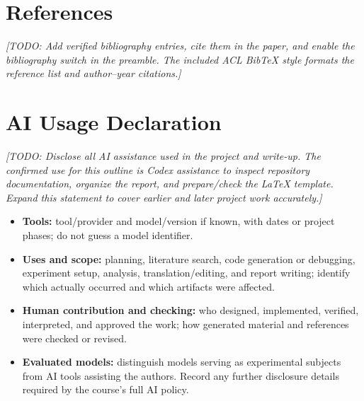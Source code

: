 \documentclass[11pt]{article}
\newcommand{\todo}[1]{\textit{[TODO: #1]}}
\begin{document}
  \section*{References}
  \todo{Add verified bibliography entries, cite them in the paper,
  and enable the bibliography switch in the preamble. The included ACL BibTeX
  style formats the reference list and author--year citations.}
\fi

\section*{AI Usage Declaration}
\label{sec:ai-declaration}
\todo{Disclose all AI assistance used in the project and write-up. The confirmed
use for this outline is Codex assistance to inspect repository documentation,
organize the report, and prepare/check the LaTeX template. Expand this statement
to cover earlier and later project work accurately.}
\begin{itemize}
  \item \textbf{Tools:} tool/provider and model/version if known, with dates or
  project phases; do not guess a model identifier.
  \item \textbf{Uses and scope:} planning, literature search, code generation or
  debugging, experiment setup, analysis, translation/editing, and report writing;
  identify which actually occurred and which artifacts were affected.
  \item \textbf{Human contribution and checking:} who designed, implemented,
  verified, interpreted, and approved the work; how generated material and
  references were checked or revised.
  \item \textbf{Evaluated models:} distinguish models serving as experimental
  subjects from AI tools assisting the authors. Record any further disclosure
  details required by the course's full AI policy.
\end{itemize}

\end{document}
